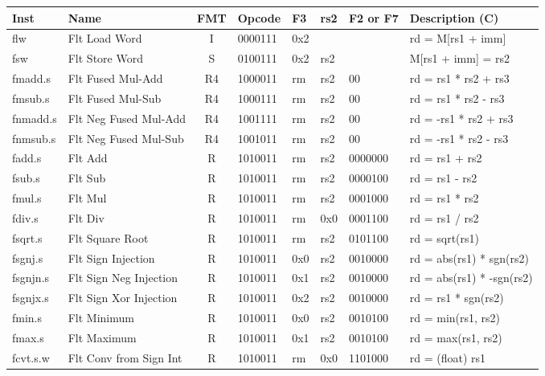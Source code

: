 \begin{center}
\begin{tabular}
{T | l | c | T | T | T | T | T } \hline
\rm Inst  & Name                  & FMT   & \rm Opcode & \rm F3 & \rm rs2 & \rm F2 or F7 & \rm Description (C) \\ \hline
flw       & Flt Load Word         & I  & 0000111 & 0x2 &     &         & rd = M[rs1 + imm]    \\
fsw       & Flt Store Word        & S  & 0100111 & 0x2 & rs2 &         & M[rs1 + imm] = rs2   \\
fmadd.s   & Flt Fused Mul-Add     & R4 & 1000011 & rm  & rs2 & 00      & rd = rs1 * rs2 + rs3 \\
fmsub.s   & Flt Fused Mul-Sub     & R4 & 1000111 & rm  & rs2 & 00      & rd = rs1 * rs2 - rs3 \\
fnmadd.s  & Flt Neg Fused Mul-Add & R4 & 1001111 & rm  & rs2 & 00      & rd = -rs1 * rs2 + rs3 \\
fnmsub.s  & Flt Neg Fused Mul-Sub & R4 & 1001011 & rm  & rs2 & 00      & rd = -rs1 * rs2 - rs3 \\
fadd.s    & Flt Add               & R  & 1010011 & rm  & rs2 & 0000000 & rd = rs1 + rs2       \\
fsub.s    & Flt Sub               & R  & 1010011 & rm  & rs2 & 0000100 & rd = rs1 - rs2       \\
fmul.s    & Flt Mul               & R  & 1010011 & rm  & rs2 & 0001000 & rd = rs1 * rs2       \\
fdiv.s    & Flt Div               & R  & 1010011 & rm  & 0x0 & 0001100 & rd = rs1 / rs2       \\
fsqrt.s   & Flt Square Root       & R  & 1010011 & rm  & rs2 & 0101100 & rd = sqrt(rs1)      \\ 
fsgnj.s   & Flt Sign Injection    & R  & 1010011 & 0x0 & rs2 & 0010000 & rd = abs(rs1) * sgn(rs2) \\
fsgnjn.s  & Flt Sign Neg Injection& R  & 1010011 & 0x1 & rs2 & 0010000 & rd = abs(rs1) * -sgn(rs2) \\
fsgnjx.s  & Flt Sign Xor Injection& R  & 1010011 & 0x2 & rs2 & 0010000 & rd = rs1 * sgn(rs2)  \\
fmin.s    & Flt Minimum           & R  & 1010011 & 0x0 & rs2 & 0010100 & rd = min(rs1, rs2)   \\
fmax.s    & Flt Maximum           & R  & 1010011 & 0x1 & rs2 & 0010100 & rd = max(rs1, rs2)   \\
fcvt.s.w  & Flt Conv from Sign Int& R  & 1010011 & rm  & 0x0 & 1101000 & rd = (float) rs1 \\

\end{tabular}
\end{center}

